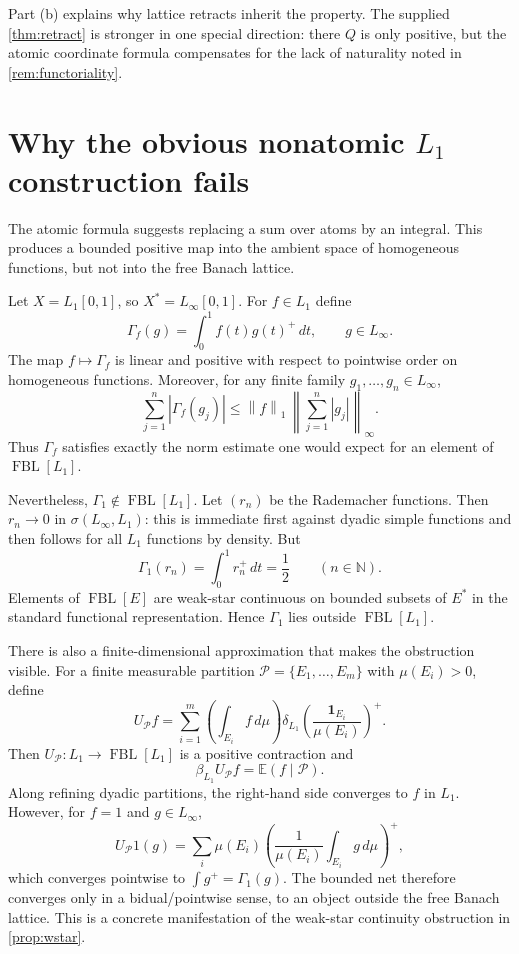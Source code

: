 \documentclass[11pt]{article}
\newcommand{\FBL}{\operatorname{FBL}}
\newcommand{\N}{\mathbb{N}}
\newcommand{\norm}[1]{\left\lVert #1\right\rVert}
\begin{document}
Part (b) explains why lattice retracts inherit the property.  The supplied
\cref{thm:retract} is stronger in one special direction: there $Q$ is only
positive, but the atomic coordinate formula compensates for the lack of
naturality noted in \cref{rem:functoriality}.

\section{Why the obvious nonatomic $L_1$ construction fails}

The atomic formula suggests replacing a sum over atoms by an integral.  This
produces a bounded positive map into the ambient space of homogeneous
functions, but not into the free Banach lattice.

Let $X=L_1[0,1]$, so $X^*=L_\infty[0,1]$.  For $f\in L_1$ define
\[
 \Gamma_f(g)=\int_0^1 f(t)g(t)^+\,dt,
 \qquad g\in L_\infty.
\]
The map $f\mapsto\Gamma_f$ is linear and positive with respect to pointwise
order on homogeneous functions.  Moreover, for any finite family
$g_1,\dots,g_n\in L_\infty$,
\[
 \sum_{j=1}^n|\Gamma_f(g_j)|
 \leq \norm{f}_1\,
 \norm{\sum_{j=1}^n|g_j|}_\infty.
\]
Thus $\Gamma_f$ satisfies exactly the norm estimate one would expect for an
element of $\FBL[L_1]$.

Nevertheless, $\Gamma_1\notin\FBL[L_1]$.  Let $(r_n)$ be the Rademacher
functions.  Then $r_n\to0$ in $\sigma(L_\infty,L_1)$: this is immediate first
against dyadic simple functions and then follows for all $L_1$ functions by
density.  But
\[
 \Gamma_1(r_n)=\int_0^1r_n^+\,dt=\frac12
 \qquad(n\in\N).
\]
Elements of $\FBL[E]$ are weak-star continuous on bounded subsets of $E^*$ in
the standard functional representation.  Hence $\Gamma_1$ lies outside
$\FBL[L_1]$.

There is also a finite-dimensional approximation that makes the obstruction
visible.  For a finite measurable partition
$\mathcal P=\{E_1,\dots,E_m\}$ with $\mu(E_i)>0$, define
\[
 U_{\mathcal P}f
 =\sum_{i=1}^m
 \left(\int_{E_i}f\,d\mu\right)
 \delta_{L_1}\left(\frac{\mathbf1_{E_i}}{\mu(E_i)}\right)^+.
\]
Then $U_{\mathcal P}:L_1\to\FBL[L_1]$ is a positive contraction and
\[
 \beta_{L_1}U_{\mathcal P}f
 =\mathbb E(f\mid\mathcal P).
\]
Along refining dyadic partitions, the right-hand side converges to $f$ in
$L_1$.  However, for $f=1$ and $g\in L_\infty$,
\[
 U_{\mathcal P}1(g)
 =\sum_i\mu(E_i)
 \left(\frac1{\mu(E_i)}\int_{E_i}g\,d\mu\right)^+,
\]
which converges pointwise to $\int g^+=\Gamma_1(g)$.  The bounded net therefore
converges only in a bidual/pointwise sense, to an object outside the free
Banach lattice.  This is a concrete manifestation of the weak-star
continuity obstruction in \cref{prop:wstar}.
\end{document}
